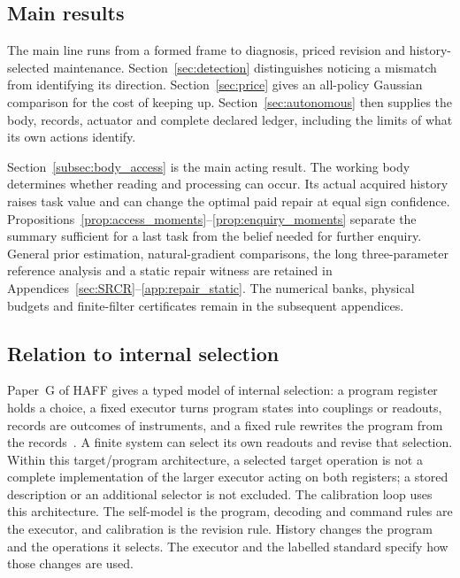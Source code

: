\documentclass[12pt]{article}
\theoremstyle{definition}
\begin{document}
\subsection{Main results}
\label{subsec:results}

The main line runs from a formed frame to diagnosis, priced revision
and history-selected maintenance.
Section~\ref{sec:detection} distinguishes noticing a mismatch from
identifying its direction. Section~\ref{sec:price} gives an all-policy
Gaussian comparison for the cost of keeping up.
Section~\ref{sec:autonomous} then supplies the body, records,
actuator and complete declared ledger, including the limits of what
its own actions identify.

Section~\ref{subsec:body_access} is the main acting result.
The working body determines whether reading and processing can occur.
Its actual acquired history raises task value and can change the
optimal paid repair at equal sign confidence.
Propositions~\ref{prop:access_moments}--\ref{prop:enquiry_moments}
separate the summary sufficient for a last task from the belief needed
for further enquiry.
General prior estimation, natural-gradient comparisons, the long
three-parameter reference analysis and a static repair witness are
retained in Appendices~\ref{sec:SRCR}--\ref{app:repair_static}.
The numerical banks, physical budgets and finite-filter certificates
remain in the subsequent appendices.

\subsection{Relation to internal selection}
\label{subsec:haff_g}

Paper~G of HAFF gives a typed model of internal selection: a program register holds a choice, a fixed executor turns program states into couplings or readouts, records are outcomes of instruments, and a fixed rule rewrites the program from the records~\cite{Liu2026HAFF_G}. A finite system can select its own readouts and revise that selection. Within this target/program architecture, a selected target operation is not a complete implementation of the larger executor acting on both registers; a stored description or an additional selector is not excluded. The calibration loop uses this architecture. The self-model is the program, decoding and command rules are the executor, and calibration is the revision rule. History changes the program and the operations it selects. The executor and the labelled standard specify how those changes are used.
\end{document}
